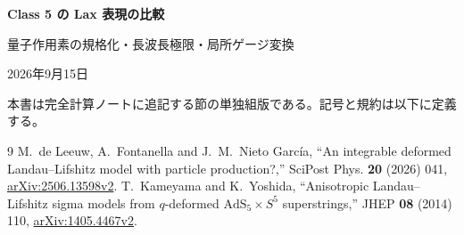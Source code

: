 \documentclass[a4paper,11pt]{ltjsarticle}
\numberwithin{equation}{section}
\begin{document}
\begin{center}
{\Large\bfseries Class 5 の Lax 表現の比較}\par
\medskip
{\normalsize 量子作用素の規格化・長波長極限・局所ゲージ変換}\par
\smallskip
{\normalsize 2026年9月15日}
\end{center}
\noindent 本書は完全計算ノートに追記する節の単独組版である。記号と規約は以下に定義する。


\begin{thebibliography}{9}
M.~de Leeuw, A.~Fontanella and J.~M.~Nieto Garc\'ia,
``An integrable deformed Landau--Lifshitz model with particle production?,''
SciPost Phys. \textbf{20} (2026) 041,
\href{https://arxiv.org/abs/2506.13598v2}{arXiv:2506.13598v2}.
T.~Kameyama and K.~Yoshida,
``Anisotropic Landau--Lifshitz sigma models from $q$-deformed $\mathrm{AdS}_5\times S^5$ superstrings,''
JHEP \textbf{08} (2014) 110,
\href{https://arxiv.org/abs/1405.4467v2}{arXiv:1405.4467v2}.
\end{thebibliography}
\end{document}
